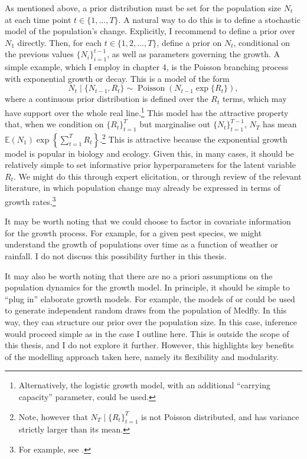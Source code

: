 \documentclass[
  oneside]{book}
\begin{document}
As mentioned above, a prior distribution must be set for the population size \(N_t\) at each time point \(t \in \{1, \ldots, T\}\). A natural way to do this is to define a stochastic model of the population's change. Explicitly, I recommend to define a prior over \(N_1\) directly. Then, for each \(t \in \{1,2, \ldots, T\}\), define a prior on \(N_t\), conditional on the previous values \(\{N_i\}_{i=1}^{t-1}\), as well as parameters governing the growth. A simple example, which I employ in chapter 4, is the Poisson branching process with exponential growth or decay. This is a model of the form
\[
N_t \mid \{N_{t-1}, R_t\} \sim \operatorname{Poisson}(N_{t-1} \exp \{R_t\}),
\]
where a continuous prior distribution is defined over the \(R_t\) terms, which may have support over the whole real line.\footnote{Alternatively, the logistic growth model, with an additional ``carrying capacity'' parameter, could be used.} This model has the attractive property that, when we condition on \(\{R_t\}_{t=1}^T\) but marginalise out \(\{N_t\}_{t=1}^{T-1}\), \(N_T\) has mean \(\mathbb E(N_1) \exp \left\{ \sum_{t=1}^T R_t \right\}\).\footnote{Note, however that \(N_T \mid \{R_t\}_{t=1}^T\) is not Poisson distributed, and has variance strictly larger than its mean.} This is attractive because the exponential growth model is popular in biology and ecology. Given this, in many cases, it should be relatively simple to set informative prior hyperparameters for the latent variable \(R_t\). We might do this through expert elicitation, or through review of the relevant literature, in which population change may already be expressed in terms of growth rates.\footnote{For example, see \citet{papadopoulos2002}.}

It may be worth noting that we could choose to factor in covariate information for the growth process. For example, for a given pest species, we might understand the growth of populations over time as a function of weather or rainfall. I do not discuss this possibility further in this thesis.

It may also be worth noting that there are no a priori assumptions on the population dynamics for the growth model. In principle, it should be simple to ``plug in'' elaborate growth models. For example, the models of \citet{lux2018} or \citet{manoukis2014} could be used to generate independent random draws from the population of Medfly. In this way, they can structure our prior over the population size. In this case, inference would proceed simple as in the case I outline here. This is outside the scope of this thesis, and I do not explore it further. However, this highlights key benefits of the modelling approach taken here, namely its flexibility and modularity.
\end{document}
